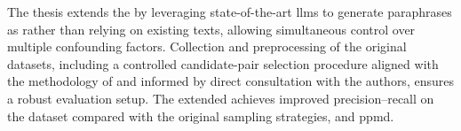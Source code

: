 The thesis extends the \impAppr{} by leveraging state-of-the-art \acp{llm} to generate paraphrases as \imps{} rather than relying on existing texts, allowing simultaneous control over multiple confounding factors.
Collection and preprocessing of the original datasets, including a controlled candidate-pair selection procedure aligned with the methodology of \citet{koppel_determining_2014} and informed by direct consultation with the authors, ensures a robust evaluation setup. 
The extended \impAppr{} achieves improved precision–recall on the \dataStudent{} dataset compared with the original sampling strategies, \unmasking{} and \acs{ppmd}.
